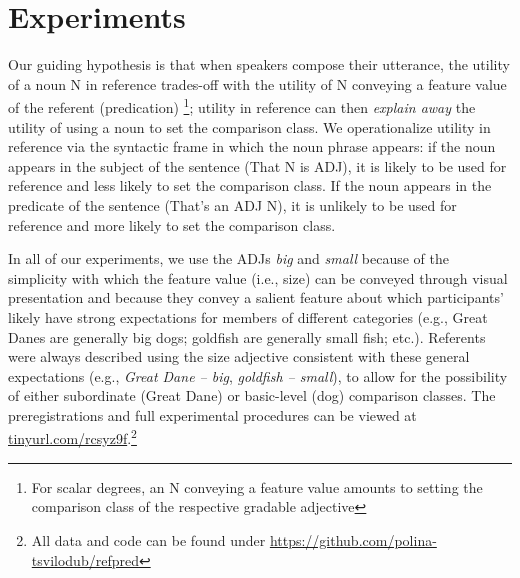 \documentclass[10pt,letterpaper]{article}
\begin{document}
\section{Experiments}
Our guiding hypothesis is that when speakers compose their utterance, the utility of a noun N in reference trades-off with the utility of N conveying a feature value of the referent (predication) \footnote{For scalar degrees, an N conveying a feature value amounts to setting the comparison class of the respective gradable adjective}; utility in reference can then \emph{explain away} the utility of using a noun to set the comparison class. 
We operationalize utility in reference via the syntactic frame in which the noun phrase appears: if the noun appears in the subject of the sentence (That N is ADJ), it is likely to be used for reference and less likely to set the comparison class. If the noun appears in the predicate of the sentence (That's an ADJ N), it is unlikely to be used for reference and more likely to set the comparison class. 

In all of our experiments, we use the ADJs \emph{big} and \emph{small} because of the simplicity with which the feature value (i.e., size) can be conveyed through visual presentation and because they convey a salient feature about which participants' likely have strong expectations for members of different categories (e.g., Great Danes are generally big dogs; goldfish are generally small fish; etc.). 
Referents were always described using the size adjective consistent with these general expectations (e.g., \emph{Great Dane -- big}, \emph{goldfish -- small}), to allow for the possibility of either subordinate (Great Dane) or basic-level (dog) comparison classes.
The preregistrations and full experimental procedures can be viewed at \url{tinyurl.com/rcsyz9f}.\footnote{All data and code can be found under \url{https://github.com/polina-tsvilodub/refpred}}

\end{document}
